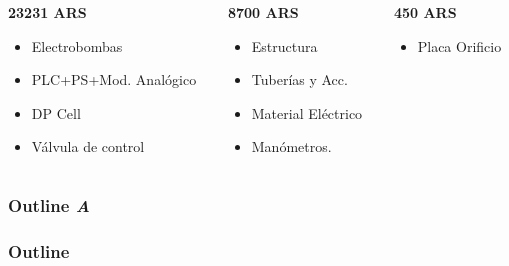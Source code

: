 {\begin{columns}[T]
	 \begin{column}{0.3\textwidth}
	    \begin{techintblock}
		\centering
		\textbf{23231 ARS}
	    \end{techintblock}
	    \footnotesize
	    \begin{itemize}
	     \item Electrobombas
	     \item PLC+PS+Mod. Analógico
	     \item DP Cell
	     \item Válvula de control
	    \end{itemize}
	 \end{column}
	 
	 \begin{column}{0.3\textwidth}
	    \begin{fingblock}
		\centering
		\textbf{8700 ARS}
	    \end{fingblock}
	    \footnotesize
	     \begin{itemize}
	      \item Estructura
	      \item Tuberías y Acc.
	      \item Material Eléctrico
	      \item Manómetros.
	     \end{itemize}
	 \end{column}

	 \begin{column}{0.3\textwidth}
	    \begin{puglesiblock}
		\centering
		\textbf{450 ARS}
	    \end{puglesiblock}
	    \footnotesize
	    \begin{itemize}
	     \item Placa Orificio
	    \end{itemize}

	 \end{column}

	\end{columns}
	
}

\begin{frame}
	\ifdebug
	\frametitle{Outline\hfill{\color{red} \emph{A}}}
	\else
	\frametitle{Outline}
	\fi

    \tableofcontents
\end{frame}
